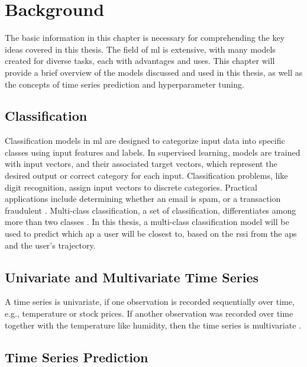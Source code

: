 \chapter{Background}\label{ch:background}

The basic information in this chapter is necessary for comprehending the key ideas covered in this thesis.
The field of \ac{ml} is extensive, with many models created for diverse tasks, each with advantages and uses.
This chapter will provide a brief overview of the models discussed and used in this thesis, as well as the concepts of time series prediction and hyperparameter tuning.

\section{Classification}

Classification models in \ac{ml} are designed to categorize input data into specific classes using input features and labels.
In supervised learning, models are trained with input vectors, and their associated target vectors, which represent the desired output or correct category for each input.
Classification problems, like digit recognition, assign input vectors to discrete categories.
Practical applications include determining whether an email is spam, or a transaction fraudulent \cite{binary-classification}.
Multi-class classification, a set of classification, differentiates among more than two classes \cite{BishopPatternRecognition}.
In this thesis, a multi-class classification model will be used to predict which \ac{ap} a user will be closest to, based on the \ac{rssi} from the \acp{ap} and the user's trajectory.


\section{Univariate and Multivariate Time Series}

A time series is univariate, if one observation is recorded sequentially over time, e.g., temperature or stock prices.
If another observation was recorded over time together with the temperature like humidity, then the time series is multivariate \cite{brownleeDeepLearningTime}.

\section{Time Series Prediction}

